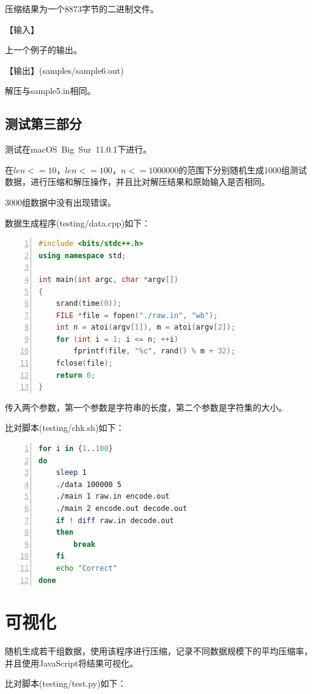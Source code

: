 \documentclass{article}
\begin{document}
压缩结果为一个8873字节的二进制文件。

【输入】

上一个例子的输出。

【输出】(samples/sample6.out)

解压与sample5.in相同。

\subsection{测试第三部分}

测试在macOS\ Big\ Sur\ 11.0.1下进行。

在$len<=10$，$len<=100$，$n<=1000000$的范围下分别随机生成1000组测试数据，进行压缩和解压操作，并且比对解压结果和原始输入是否相同。

3000组数据中没有出现错误。

数据生成程序(testing/data.cpp)如下：

\begin{lstlisting}[language={C++},
    numbers=left,
    numberstyle=\tiny\consolas,
    basicstyle=\small\consolas]
#include <bits/stdc++.h>
using namespace std;

int main(int argc, char *argv[])
{
    srand(time(0));
    FILE *file = fopen("./raw.in", "wb");
    int n = atoi(argv[1]), m = atoi(argv[2]);
    for (int i = 1; i <= n; ++i)
        fprintf(file, "%c", rand() % m + 32);
    fclose(file);
    return 0;
}
\end{lstlisting}

传入两个参数，第一个参数是字符串的长度，第二个参数是字符集的大小。

比对脚本(testing/chk.sh)如下：

\begin{lstlisting}[language={bash},
    numbers=left,
    numberstyle=\tiny\consolas,
    basicstyle=\small\consolas]
for i in {1..100}
do
    sleep 1
    ./data 100000 5
    ./main 1 raw.in encode.out
    ./main 2 encode.out decode.out
    if ! diff raw.in decode.out
    then
        break
    fi
    echo "Correct"
done
\end{lstlisting}

\section{可视化}

随机生成若干组数据，使用该程序进行压缩，记录不同数据规模下的平均压缩率，并且使用JavaScript将结果可视化。

比对脚本(testing/test.py)如下：
\end{document}

